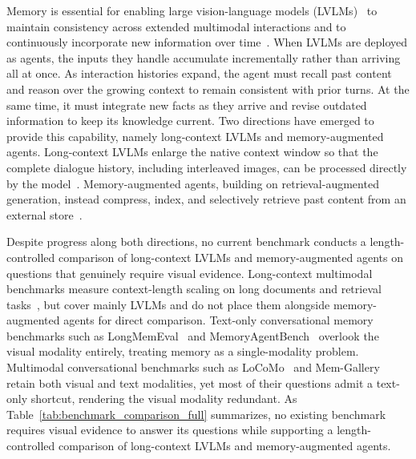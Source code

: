 \documentclass{llmxive}
\begin{document}
Memory is essential for enabling large vision-language models (LVLMs)~\citep{seed2_0,singh2025openaigpt5card} to maintain consistency across extended multimodal interactions and to continuously incorporate new information over time~\cite{openai2023gpt4,anthropic2024claude3,team2024gemini}. When LVLMs are deployed as agents, the inputs they handle accumulate incrementally rather than arriving all at once. As interaction histories expand, the agent must recall past content and reason over the growing context to remain consistent with prior turns. At the same time, it must integrate new facts as they arrive and revise outdated information to keep its knowledge current. Two directions have emerged to provide this capability, namely long-context LVLMs and memory-augmented agents. Long-context LVLMs enlarge the native context window so that the complete dialogue history, including interleaved images, can be processed directly by the model~\cite{team2024gemini,seed1_8,anthropic2025claudesonnet45card}. Memory-augmented agents, building on retrieval-augmented generation, instead compress, index, and selectively retrieve past content from an external store~\cite{packer2024memgptllmsoperatingsystems,mem0,jin2024long}.

Despite progress along both directions, no current benchmark conducts a length-controlled comparison of long-context LVLMs and memory-augmented agents on questions that genuinely require visual evidence. Long-context multimodal benchmarks measure context-length scaling on long documents and retrieval tasks~\cite{mmlongbench,wang2024needlemultimodalhaystack,ma2024mmlongbenchdocbenchmarkinglongcontextdocument}, but cover mainly LVLMs and do not place them alongside memory-augmented agents for direct comparison. Text-only conversational memory benchmarks such as LongMemEval~\cite{wu2025longmemevalbenchmarkingchatassistants} and MemoryAgentBench~\cite{memoryagentbench} overlook the visual modality entirely, treating memory as a single-modality problem. Multimodal conversational benchmarks such as LoCoMo~\cite{maharana2024evaluatinglongtermconversationalmemory} and Mem-Gallery~\cite{memgallery} retain both visual and text modalities, yet most of their questions admit a text-only shortcut, rendering the visual modality redundant. As Table~\ref{tab:benchmark_comparison_full} summarizes, no existing benchmark requires visual evidence to answer its questions while supporting a length-controlled comparison of long-context LVLMs and memory-augmented agents.
\end{document}
